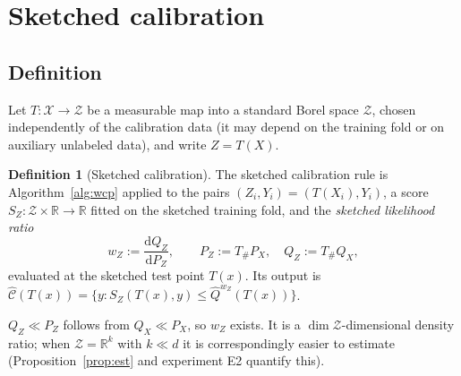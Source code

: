 \documentclass[11pt,a4paper]{article}
\newcommand{\PX}{P_X}
\newcommand{\QX}{Q_X}
\newcommand{\R}{\mathbb{R}}
\newcommand{\Cset}{\widehat{\mathcal C}}
\newcommand{\Zc}{\mathcal Z}
\theoremstyle{plain}
\theoremstyle{definition}
\newtheorem{definition}[theorem]{Definition}
\theoremstyle{remark}
\begin{document}
\section{Sketched calibration}\label{sec:sketch}

\subsection{Definition}

Let $T:\mathcal X\to\Zc$ be a measurable map into a standard Borel space $\Zc$, chosen independently of the calibration data (it may depend on the training fold or on auxiliary unlabeled data), and write $Z=T(X)$.

\begin{definition}[Sketched calibration]\label{def:sketch}
The sketched calibration rule is Algorithm~\ref{alg:wcp} applied to the pairs $(Z_i,Y_i)=(T(X_i),Y_i)$, a score $S_Z:\Zc\times\R\to\R$ fitted on the sketched training fold, and the \emph{sketched likelihood ratio}
\[
w_Z:=\frac{\mathrm dQ_Z}{\mathrm dP_Z},\qquad P_Z:=T_\#\PX,\quad Q_Z:=T_\#\QX ,
\]
evaluated at the sketched test point $T(x)$. Its output is $\Cset(T(x))=\{y:S_Z(T(x),y)\le\widehat Q^{w_Z}(T(x))\}$.
\end{definition}

$Q_Z\ll P_Z$ follows from $\QX\ll\PX$, so $w_Z$ exists. It is a $\dim\Zc$-dimensional density ratio; when $\Zc=\R^k$ with $k\ll d$ it is correspondingly easier to estimate (Proposition~\ref{prop:est} and experiment E2 quantify this).
\end{document}
